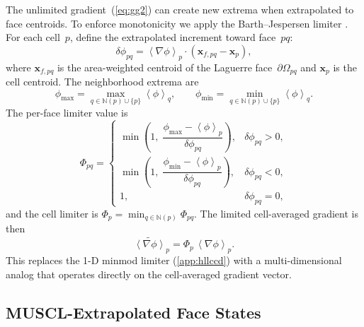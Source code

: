 \documentclass[twocolumn]{aastex63}
\newcommand{\vect}[1]{\mathbf{#1}}
\begin{document}
The unlimited gradient~(\ref{eq:gg2}) can create new extrema
when extrapolated to face centroids.
To enforce monotonicity we apply the Barth--Jespersen limiter
\citep{barth1989}.
For each cell~$p$, define the extrapolated increment toward face~$pq$:
\begin{equation}
  \delta\phi_{pq}
  = \left<\nabla\phi\right>_p \cdot
    (\vect{x}_{f,pq} - \vect{x}_p),
\end{equation}
where $\vect{x}_{f,pq}$ is the area-weighted centroid of the
Laguerre face~$\partial\Omega_{pq}$ and $\vect{x}_p$ is the
cell centroid.
The neighborhood extrema are
\begin{equation}
  \phi_{\max} = \max_{q\in\mathbb{N}(p)\cup\{p\}}
    \left<\phi\right>_q, \qquad
  \phi_{\min} = \min_{q\in\mathbb{N}(p)\cup\{p\}}
    \left<\phi\right>_q.
\end{equation}
The per-face limiter value is
\begin{equation}
  \Phi_{pq} = \begin{cases}
    \min\!\left(1,\;
      \dfrac{\phi_{\max} - \left<\phi\right>_p}
            {\delta\phi_{pq}}\right),
      & \delta\phi_{pq} > 0, \\[8pt]
    \min\!\left(1,\;
      \dfrac{\phi_{\min} - \left<\phi\right>_p}
            {\delta\phi_{pq}}\right),
      & \delta\phi_{pq} < 0, \\[8pt]
    1, & \delta\phi_{pq} = 0,
  \end{cases}
\end{equation}
and the cell limiter is
$\Phi_p = \min_{q\in\mathbb{N}(p)} \Phi_{pq}$.
The limited cell-averaged gradient is then
\begin{equation}\label{eq:limgrad}
  \widetilde{\left<\nabla\phi\right>}_p
  = \Phi_p\,\left<\nabla\phi\right>_p.
\end{equation}
This replaces the 1-D minmod limiter
(\ref{app:hllccd})
with a multi-dimensional analog that operates directly
on the cell-averaged gradient vector.


\subsection{MUSCL-Extrapolated Face States}
\end{document}
